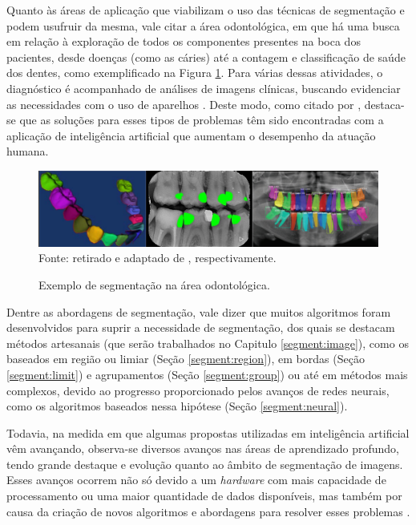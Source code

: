 Quanto às áreas de aplicação que viabilizam o uso das técnicas de segmentação e podem usufruir da mesma, vale citar a área odontológica, em que há uma busca em relação à exploração de todos os componentes presentes na boca dos pacientes, desde doenças (como as cáries) até a contagem e classificação de saúde dos dentes, como exemplificado na Figura \ref{intro:fig:4}. Para várias dessas atividades, o diagnóstico é acompanhado de análises de imagens clínicas, buscando evidenciar as necessidades com o uso de aparelhos \cite{Schwendicke2020}. Deste modo, como citado por \cite{Bansal2021, Nguyen2021,Schwendicke2020}, destaca-se que as soluções para esses tipos de problemas têm sido encontradas com a aplicação de inteligência artificial que aumentam o desempenho da atuação humana.

\begin{figure}[H]
    \centering
    \caption{Exemplo de segmentação na área odontológica.}
    \includegraphics[width=1\linewidth]{recursos/imagens/introduction/odonto_segmentation.png}
    \label{intro:fig:4}
    Fonte: retirado e adaptado de \cite{Shuai2016,Bayrakdar2021,Gil2019}, respectivamente.
\end{figure}

Dentre as abordagens de segmentação, vale dizer que muitos algoritmos foram desenvolvidos para suprir a necessidade de segmentação, dos quais se destacam métodos artesanais (que serão trabalhados no Capitulo \ref{segment:image}), como os baseados em região ou limiar (Seção \ref{segment:region}), em bordas (Seção \ref{segment:limit}) e agrupamentos (Seção \ref{segment:group}) ou até em métodos mais complexos, devido ao progresso proporcionado pelos avanços de redes neurais, como os algoritmos baseados nessa hipótese (Seção \ref{segment:neural}).

Todavia, na medida em que algumas propostas utilizadas em inteligência artificial vêm avançando, observa-se diversos avanços nas áreas de aprendizado profundo, tendo grande destaque e evolução quanto ao âmbito de segmentação de imagens. Esses avanços ocorrem não só devido a um \textit{hardware} com mais capacidade de processamento ou uma maior quantidade de dados disponíveis, mas também por causa da criação de novos algoritmos e abordagens para resolver esses problemas \cite{Szegedy2015}.


